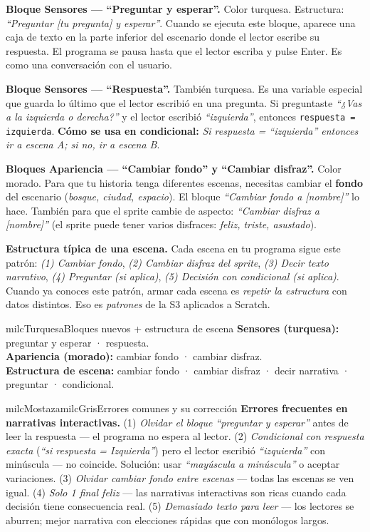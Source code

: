 \documentclass[11pt,letterpaper]{article}
\newcommand{\milcpaso}[3]{%
\Needspace{4\baselineskip}%
\begin{tcolorbox}[enhanced,colback=white,colframe=milcLinea,arc=1.5mm,boxrule=.9pt,
  left=14mm,right=4mm,top=3mm,bottom=3mm,before skip=4pt,after skip=4pt,
  fontupper=\RaggedRight,
  overlay={\node[anchor=north west,circle,fill=#2,text=white,inner sep=0pt,
    minimum size=7.4mm,font=\sffamily\bfseries\small]
    at ([xshift=3.6mm,yshift=-3.2mm]frame.north west) {#1};}]
#3
\end{tcolorbox}}
\begin{document}
\milcpaso{1}{milcTurquesa}{\textbf{Bloque Sensores --- ``Preguntar y esperar''.} Color turquesa. Estructura: \emph{``Preguntar [tu pregunta] y esperar''}. Cuando se ejecuta este bloque, aparece una caja de texto en la parte inferior del escenario donde el lector escribe su respuesta. El programa se pausa hasta que el lector escriba y pulse Enter. Es como una conversación con el usuario.}
\milcpaso{2}{milcTurquesa}{\textbf{Bloque Sensores --- ``Respuesta''.} También turquesa. Es una variable especial que guarda lo último que el lector escribió en una pregunta. Si preguntaste \emph{``¿Vas a la izquierda o derecha?''} y el lector escribió \emph{``izquierda''}, entonces \texttt{respuesta = izquierda}. \textbf{Cómo se usa en condicional:} \emph{Si respuesta = ``izquierda'' entonces ir a escena A; si no, ir a escena B}.}
\milcpaso{3}{milcTurquesa}{\textbf{Bloques Apariencia --- ``Cambiar fondo'' y ``Cambiar disfraz''.} Color morado. Para que tu historia tenga diferentes escenas, necesitas cambiar el \textbf{fondo} del escenario (\emph{bosque, ciudad, espacio}). El bloque \emph{``Cambiar fondo a [nombre]''} lo hace. También para que el sprite cambie de aspecto: \emph{``Cambiar disfraz a [nombre]''} (el sprite puede tener varios disfraces: \emph{feliz, triste, asustado}).}
\milcpaso{4}{milcTurquesa}{\textbf{Estructura típica de una escena.} Cada escena en tu programa sigue este patrón: \emph{(1) Cambiar fondo}, \emph{(2) Cambiar disfraz del sprite}, \emph{(3) Decir texto narrativo}, \emph{(4) Preguntar (si aplica)}, \emph{(5) Decisión con condicional (si aplica)}. Cuando ya conoces este patrón, armar cada escena es \emph{repetir la estructura} con datos distintos. Eso es \emph{patrones} de la S3 aplicados a Scratch.}

\begin{drawbox}{milcTurquesa}{Bloques nuevos + estructura de escena}
\textbf{Sensores (turquesa):} preguntar y esperar · respuesta. \\[1mm]
\textbf{Apariencia (morado):} cambiar fondo · cambiar disfraz. \\[1mm]
\textbf{Estructura de escena:} cambiar fondo · cambiar disfraz · decir narrativa · preguntar · condicional.
\end{drawbox}

\begin{softbox}{milcMostaza}{milcGris}{Errores comunes y su corrección}
\textbf{Errores frecuentes en narrativas interactivas.} (1) \emph{Olvidar el bloque ``preguntar y esperar''} antes de leer la respuesta --- el programa no espera al lector. (2) \emph{Condicional con respuesta exacta} (\emph{``si respuesta = Izquierda''}) pero el lector escribió \emph{``izquierda''} con minúscula --- no coincide. Solución: usar \emph{``mayúscula a minúscula''} o aceptar variaciones. (3) \emph{Olvidar cambiar fondo entre escenas} --- todas las escenas se ven igual. (4) \emph{Solo 1 final feliz} --- las narrativas interactivas son ricas cuando cada decisión tiene consecuencia real. (5) \emph{Demasiado texto para leer} --- los lectores se aburren; mejor narrativa con elecciones rápidas que con monólogos largos.
\end{softbox}
\end{document}
